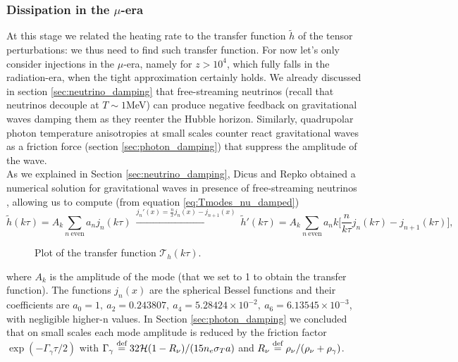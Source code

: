 \subsubsection{Dissipation in the $\mu$-era}
At this stage we related the heating rate to the transfer function $\tilde h$ of the tensor perturbations: we thus need to find such transfer function. For now let's only consider injections in the $\mu$-era, namely for $z>10^4$, which fully falls in the radiation-era, when the tight approximation certainly holds. We already discussed in section \ref{sec:neutrino_damping} that free-streaming neutrinos (recall that neutrinos decouple at $T\sim 1$MeV) can produce negative feedback on gravitational waves damping them as they reenter the Hubble horizon. Similarly, quadrupolar photon temperature anisotropies at small scales counter react gravitational waves as a friction force (section \ref{sec:photon_damping}) that suppress the amplitude of the wave.\\ As we explained in Section \ref{sec:neutrino_damping}, Dicus and Repko obtained a numerical solution for gravitational waves in presence of free-streaming neutrinos \cite{Dicus_Repko}, allowing us to compute (from equation \eqref{eq:Tmodes_nu_damped})
$$
\tilde h(k\tau)=A_k\sum_{n\ \text{even}}a_n j_n(k\tau)\ \xrightarrow{j_n'(x)=\frac{n}{x}j_{n}(x)-j_{n+1}(x)}\ \tilde h'(k\tau)=A_k\sum_{n\ \text{even}}a_nk\bigg[\frac{n}{k\tau}j_n(k\tau)-j_{n+1}(k\tau)\bigg],
$$
\begin{figure}
    \centering
{}
\caption{Plot of the transfer function $\mathcal T_h(k\tau)$. }
\label{fig:Th}
\end{figure}
where $A_k$ is the amplitude of the mode (that we set to 1 to obtain the transfer function). The functions $j_n(x)$ are the spherical Bessel functions and their coefficients are $a_0=1,\ a_2=0.243807,\ a_4=5.28424\times10^{-2},\ a_6=6.13545\times10^{-3}$, with negligible higher-n values. In Section \ref{sec:photon_damping} we concluded that on small scales each mode amplitude is reduced by the friction factor $\exp(-\Gamma_\gamma\tau/2)$ with $\Gamma_\gamma\stackrel{\text{def}}{=}32 \mathcal{H}(1-R_\nu)/(15n_e\sigma_T a)$ and $R_\nu\stackrel{\text{def}}{=}\rho_\nu/( \rho_\nu+\rho_\gamma)$. \\
